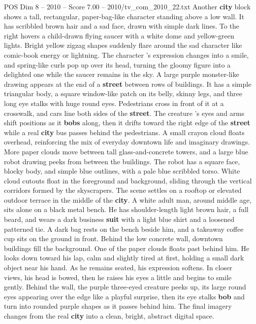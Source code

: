 \begin{textsample}{POS Dim 8 – 2010 – Score 7.00 – 2010/tv\_com\_2010\_22.txt}
Another \textbf{city} block shows a tall, rectangular, paper-bag-like character standing above a low wall.
It has scribbled brown hair and a sad face, drawn with simple dark lines.
To the right hovers a child-drawn flying saucer with a white dome and yellow-green lights.
Bright yellow zigzag shapes suddenly flare around the sad character like comic-book energy or lightning.
The character ’s expression changes into a smile, and spring-like curls pop up over its head, turning the gloomy figure into a delighted one while the saucer remains in the sky.
A large purple monster-like drawing appears at the end of a \textbf{street} between rows of buildings.
It has a simple triangular body, a square window-like patch on its belly, skinny legs, and three long eye stalks with huge round eyes.
Pedestrians cross in front of it at a crosswalk, and cars line both sides of the \textbf{street}.
The creature ’s eyes and arms shift positions as it \textbf{bobs} along, then it drifts toward the right edge of the \textbf{street} while a real \textbf{city} bus passes behind the pedestrians.
A small crayon cloud floats overhead, reinforcing the mix of everyday downtown life and imaginary drawings.
More paper clouds move between tall glass-and-concrete towers, and a large blue robot drawing peeks from between the buildings.
The robot has a square face, blocky body, and simple blue outlines, with a pale blue scribbled torso.
White cloud cutouts float in the foreground and background, sliding through the vertical corridors formed by the skyscrapers.
The scene settles on a rooftop or elevated outdoor terrace in the middle of the \textbf{city}.
A white adult man, around middle age, sits alone on a black metal bench.
He has shoulder-length light brown hair, a full beard, and wears a dark business \textbf{suit} with a light blue shirt and a loosened patterned tie.
A dark bag rests on the bench beside him, and a takeaway coffee cup sits on the ground in front.
Behind the low concrete wall, downtown buildings fill the background.
One of the paper clouds floats past behind him.
He looks down toward his lap, calm and slightly tired at first, holding a small dark object near his hand.
As he remains seated, his expression softens.
In closer views, his head is bowed, then he raises his eyes a little and begins to smile gently.
Behind the wall, the purple three-eyed creature peeks up, its large round eyes appearing over the edge like a playful surprise, then its eye stalks \textbf{bob} and turn into rounded purple shapes as it passes behind him.
The final imagery changes from the real \textbf{city} into a clean, bright, abstract digital space.

\end{textsample}

